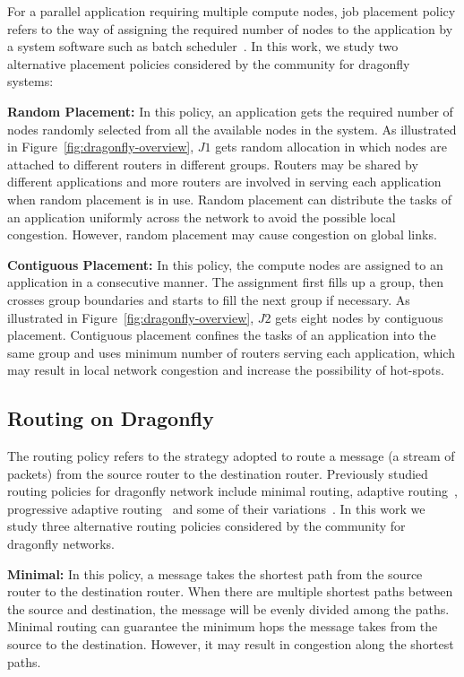 For a parallel application requiring multiple compute nodes, job placement policy refers to the way of assigning the required number of nodes to the application by a system software such as batch scheduler~\cite{xu-cluster14}. In this work, we study two alternative placement policies considered by the community for dragonfly systems: 

\textbf{Random Placement:} In this policy, an application gets the required number of nodes randomly selected from all the available nodes in the system. As illustrated in Figure~\ref{fig:dragonfly-overview}, $J1$ gets random allocation in which nodes are attached to different routers in different groups. Routers may be shared by different applications and more routers are involved in serving each application when random placement is in use. Random placement can distribute the tasks of an application uniformly across the network to avoid the possible local congestion. However, random placement may cause congestion on global links.


\textbf{Contiguous Placement:} In this policy, the compute nodes are assigned to an application in a consecutive manner. The assignment first fills up a group, then crosses group boundaries and starts to fill the next group if necessary. As illustrated in Figure~\ref{fig:dragonfly-overview}, $J2$ gets eight nodes by contiguous placement. Contiguous placement confines the tasks of an application into the same group and uses minimum number of routers serving each application, which may result in local network congestion and increase the possibility of hot-spots. 


\subsection{Routing on Dragonfly}
\label{sec:routing-schemes}

The routing policy refers to the strategy adopted to route a message (a stream of packets) from the source router to the destination router. Previously studied routing policies for dragonfly network include minimal routing, adaptive routing~\cite{dally-dragonfly}, progressive adaptive routing~\cite{jiang} and some of their variations~\cite{won-prog-adaptive}. In this work we study three alternative routing policies considered by the community for dragonfly networks.

\textbf{Minimal:} In this policy, a message takes the shortest path from the source router to the destination router. When there are multiple shortest paths between the source and destination, the message will be evenly divided among the paths. Minimal routing can guarantee the minimum hops the message takes from the source to the destination. However, it may result in congestion along the shortest paths. 

